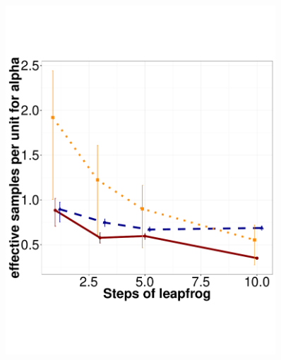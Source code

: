 



  
    \begin{figure}[H]
  \centering
  \begin{minipage}[hp]{0.45\linewidth}
  \centering
    \includegraphics [width=0.90\textwidth, angle=0]{figs/h_alpha.pdf}
      \end{minipage}
  \begin{minipage}[hp]{0.45\linewidth}
  \centering

\end{minipage}
\end{figure}
